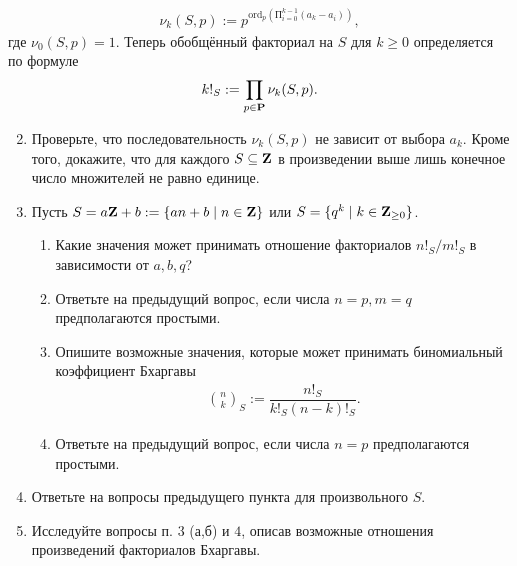 \begin{align*}
\nu_k(S,p) := p^{\text{ord}_p\left( \text{П}_{i = 0}^{k-1} (a_k - a_i)\right)},
\end{align*}
где $\nu_0(S,p) = 1.$ Теперь обобщённый факториал на $S$ для $k \geq 0$ определяется по формуле
\begin{align*}
k!_S := \prod_{p \in \text{\bfseries P}} \nu_k(S,p).
\end{align*}
\begin{enumerate} \setcounter{enumi}{1}
\item Проверьте, что последовательность $\nu_k(S,p)$ не зависит от выбора $a_k$. Кроме того, докажите, что для каждого $S \subseteq \text{\bfseries Z}$ в произведении выше лишь конечное число множителей не равно единице.
\item Пусть $S = a\text{\bfseries Z} + b := \{an + b \mid n \in \text{\bfseries Z}\}$ или $S = \{q^k \mid k \in \text{\bfseries Z}_{\geq 0}\}$. 
\begin{enumerate}
\item Какие значения может принимать отношение факториалов $n!_S/m!_S$ в зависимости от $a,b,q$?
\item Ответьте на предыдущий вопрос, если числа $n = p, m = q$ предполагаются простыми.
\item Опишите возможные значения, которые может принимать биномиальный коэффициент Бхаргавы
\begin{align*}
\binom{n}{k}_S := \dfrac{n!_S}{k!_S (n-k)!_S}.
\end{align*}
\item Ответьте на предыдущий вопрос, если числа $n = p$ предполагаются простыми.
\end{enumerate}

\item Ответьте на вопросы предыдущего пункта для произвольного $S.$

\item Исследуйте вопросы п. $3$ (а,б) и $4$, описав возможные отношения произведений факториалов Бхаргавы.
\end{enumerate}